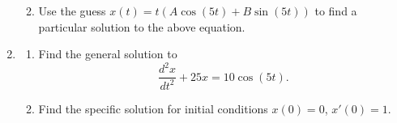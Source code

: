 \begin{enumerate}[resume]
\begin{enumerate}
\clearpage

\item Use the guess $x(t) = t(A\cos(5t) + B\sin(5t))$ to find a particular solution to the above equation. \label{13problem15parte} \vfill

\end{enumerate}

\item \label{13problem16}
\begin{enumerate}
\item Find the general solution to \label{13problem16parta}
\[
\frac{d^2x}{dt^2}+25x=10\cos(5t).
\]
\vspace{1in}
\item Find the specific solution for initial conditions $x(0)=0$, $x'(0)=1$. \label{13problem16partb} \vfill

\end{enumerate}

\end{enumerate}

\clearpage


